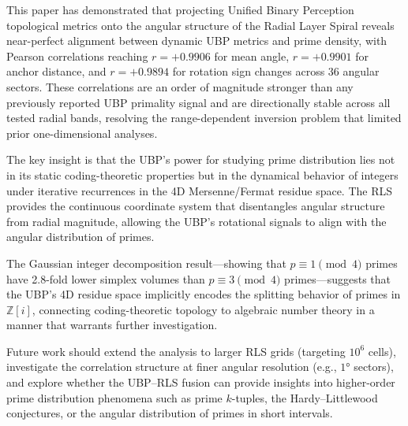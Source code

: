 \documentclass[11pt,a4paper]{article}
\theoremstyle{definition}
\newcommand{\Z}{\mathbb{Z}}
\begin{document}
This paper has demonstrated that projecting Unified Binary Perception topological metrics onto the angular structure of the Radial Layer Spiral reveals near-perfect alignment between dynamic UBP metrics and prime density, with Pearson correlations reaching $r = +0.9906$ for mean angle, $r = +0.9901$ for anchor distance, and $r = +0.9894$ for rotation sign changes across 36 angular sectors. These correlations are an order of magnitude stronger than any previously reported UBP primality signal and are directionally stable across all tested radial bands, resolving the range-dependent inversion problem that limited prior one-dimensional analyses.

The key insight is that the UBP's power for studying prime distribution lies not in its static coding-theoretic properties but in the dynamical behavior of integers under iterative recurrences in the 4D Mersenne/Fermat residue space. The RLS provides the continuous coordinate system that disentangles angular structure from radial magnitude, allowing the UBP's rotational signals to align with the angular distribution of primes.

The Gaussian integer decomposition result---showing that $p \equiv 1 \pmod{4}$ primes have 2.8-fold lower simplex volumes than $p \equiv 3 \pmod{4}$ primes---suggests that the UBP's 4D residue space implicitly encodes the splitting behavior of primes in $\Z[i]$, connecting coding-theoretic topology to algebraic number theory in a manner that warrants further investigation.

Future work should extend the analysis to larger RLS grids (targeting $10^6$ cells), investigate the correlation structure at finer angular resolution (e.g., $1°$ sectors), and explore whether the UBP--RLS fusion can provide insights into higher-order prime distribution phenomena such as prime $k$-tuples, the Hardy--Littlewood conjectures, or the angular distribution of primes in short intervals.
\end{document}
